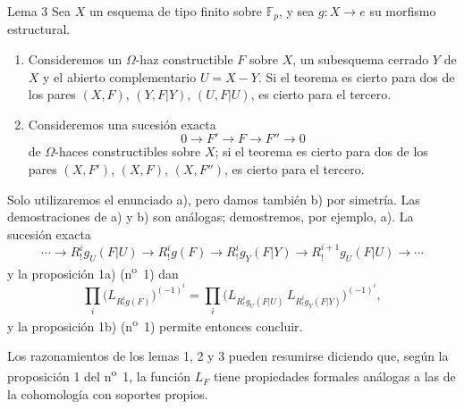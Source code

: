 \begin{statement}{Lema 3}
Sea $X$ un esquema de tipo finito sobre $\mathbb F_p$, y sea $g:X\to e$ su morfismo estructural.
\begin{enumerate}[label=\alph*)]
\item Consideremos un $\Omega$-haz constructible $F$ sobre $X$, un subesquema cerrado $Y$ de $X$ y el abierto complementario $U=X-Y$. Si el teorema es cierto para dos de los pares $(X,F)$, $(Y,F|Y)$, $(U,F|U)$, es cierto para el tercero.
\item Consideremos una sucesión exacta
\[
0\longrightarrow F'\longrightarrow F\longrightarrow F''\longrightarrow0
\]
de $\Omega$-haces constructibles sobre $X$; si el teorema es cierto para dos de los pares $(X,F')$, $(X,F)$, $(X,F'')$, es cierto para el tercero.
\end{enumerate}
\end{statement}

Solo utilizaremos el enunciado a), pero damos también b) por simetría. Las demostraciones de a) y b) son análogas; demostremos, por ejemplo, a). La sucesión exacta
\[
\cdots\longrightarrow R^i_!g_U(F|U)\longrightarrow R^i_!g(F)
\longrightarrow R^i_!g_Y(F|Y)\longrightarrow R^{i+1}_!g_U(F|U)\longrightarrow\cdots
\]
y la proposición 1a) (n\textsuperscript{o}~1) dan
\[
\prod_i\bigl(L_{R^i_!g(F)}\bigr)^{(-1)^i}
=\prod_i\bigl(L_{R^i_!g_U(F|U)}\,L_{R^i_!g_Y(F|Y)}\bigr)^{(-1)^i},
\]
y la proposición 1b) (n\textsuperscript{o}~1) permite entonces concluir.

Los razonamientos de los lemas 1, 2 y 3 pueden resumirse diciendo que, según la proposición 1 del n\textsuperscript{o}~1, la función $L_F$ tiene propiedades formales análogas a las de la cohomología con soportes propios.
